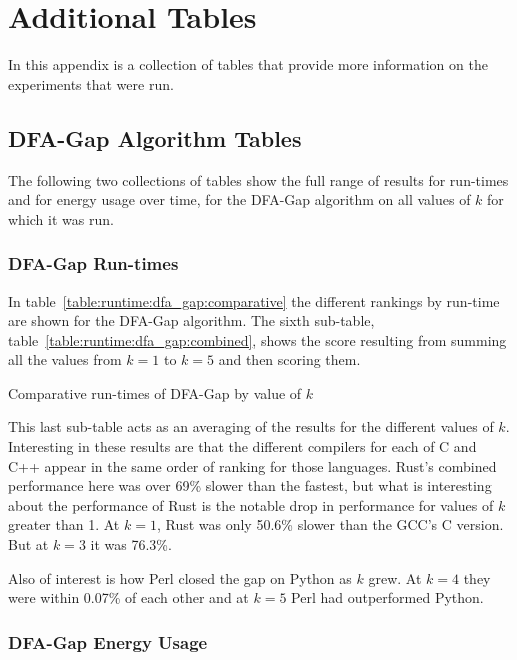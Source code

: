 \section{Additional Tables}
\label{sec:extra_tables}

In this appendix is a collection of tables that provide more information on the experiments that were run.

\subsection{DFA-Gap Algorithm Tables}

The following two collections of tables show the full range of results for run-times and for energy usage over time, for the DFA-Gap algorithm on all values of $k$ for which it was run.

\subsubsection{DFA-Gap Run-times}

In table~\ref{table:runtime:dfa_gap:comparative} the different rankings by run-time are shown for the DFA-Gap algorithm. The sixth sub-table, table~\ref{table:runtime:dfa_gap:combined}, shows the score resulting from summing all the values from $k=1$ to $k=5$ and then scoring them.

\begin{table}[!htb]

\caption{Comparative run-times of DFA-Gap by value of $k$}
\label{table:runtime:dfa_gap:comparative}
\end{table}

This last sub-table acts as an averaging of the results for the different values of $k$. Interesting in these results are that the different compilers for each of C and C++ appear in the same order of ranking for those languages. Rust's combined performance here was over 69\% slower than the fastest, but what is interesting about the performance of Rust is the notable drop in performance for values of $k$ greater than 1. At $k=1$, Rust was only 50.6\% slower than the GCC's C version. But at $k=3$ it was 76.3\%.

Also of interest is how Perl closed the gap on Python as $k$ grew. At $k=4$ they were within 0.07\% of each other and at $k=5$ Perl had outperformed Python.

\subsubsection{DFA-Gap Energy Usage}

